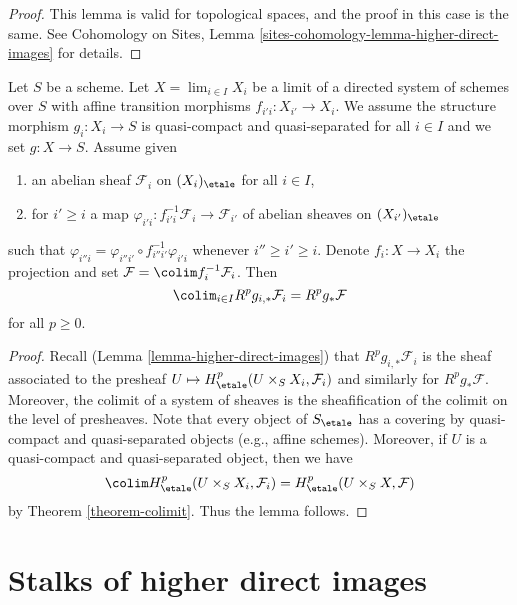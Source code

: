 \begin{proof}
This lemma is valid for topological spaces, and the proof in this case is the
same. See
Cohomology on Sites, Lemma
\ref{sites-cohomology-lemma-higher-direct-images}
for details.
\end{proof}

\begin{lemma}
\label{lemma-relative-colimit}
Let $S$ be a scheme. Let $X = \lim_{i \in I} X_i$ be a limit of a
directed system of schemes over $S$ with affine transition morphisms
$f_{i'i} : X_{i'} \to X_i$. We assume the structure morphism
$g_i : X_i \to S$ is quasi-compact and quasi-separated for all $i \in I$
and we set $g : X \to S$. Assume given
\begin{enumerate}
\item an abelian sheaf $\mathcal{F}_i$ on $(X_i)_\etale$ for all $i \in I$,
\item for $i' \geq i$ a map
$\varphi_{i'i} : f_{i'i}^{-1}\mathcal{F}_i \to \mathcal{F}_{i'}$
of abelian sheaves on $(X_{i'})_\etale$
\end{enumerate}
such that $\varphi_{i''i} = \varphi_{i''i'} \circ f_{i'' i'}^{-1}\varphi_{i'i}$
whenever $i'' \geq i' \geq i$.
Denote $f_i : X \to X_i$ the projection and set
$\mathcal{F} = \colim f_i^{-1}\mathcal{F}_i$. Then
$$
\colim_{i\in I} R^p g_{i, *} \mathcal{F}_i = R^p g_* \mathcal{F}
$$
for all $p \geq 0$.
\end{lemma}

\begin{proof}
Recall (Lemma \ref{lemma-higher-direct-images})
that $R^p g_{i, *} \mathcal{F}_i$ is the sheaf associated to the
presheaf $U \mapsto H^p_\etale(U \times_S X_i, \mathcal{F}_i)$
and similarly for $R^pg_*\mathcal{F}$. Moreover, the colimit of a
system of sheaves is the sheafification of the colimit on the level
of presheaves. Note that every object of $S_\etale$ has a covering
by quasi-compact and quasi-separated objects (e.g., affine schemes).
Moreover, if $U$ is a quasi-compact and quasi-separated object,
then we have
$$
\colim H^p_\etale(U \times_S X_i, \mathcal{F}_i) =
H^p_\etale(U \times_S X, \mathcal{F})
$$
by Theorem \ref{theorem-colimit}. Thus the lemma follows.
\end{proof}





\section{Stalks of higher direct images}
\label{section-stalks-direct-image}

